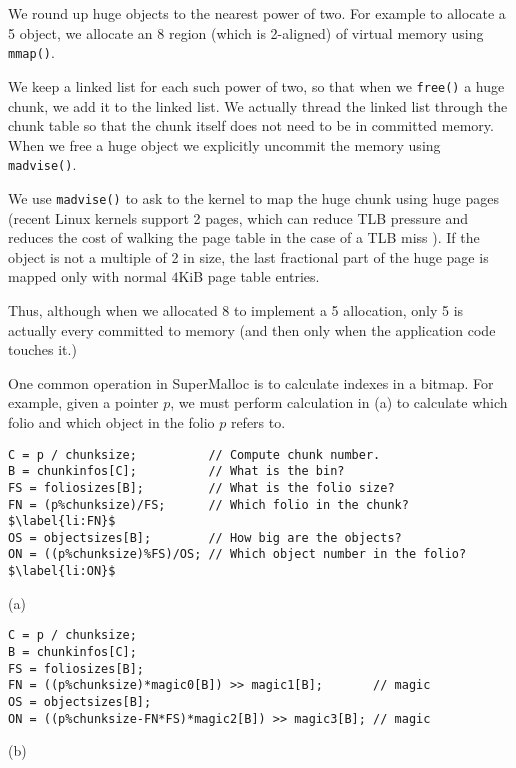 \documentclass[pldi]{sigplanconf-pldi15}
\newcommand{\code}[1]{\texttt{#1}}
\begin{document}
We round up huge objects to the nearest power of two.  For example to
allocate a \unit{5}\mebi\byte{} object, we allocate an
\unit{8}\mebi\byte{} region (which is \unit{2}\mebi\byte{}-aligned) of
virtual memory using \code{mmap()}.

We keep a linked list for each such power of two, so that when we
\code{free()} a huge chunk, we add it to the linked list.  We actually
thread the linked list through the chunk table so that the chunk
itself does not need to be in committed memory.  When we free a huge
object we explicitly uncommit the memory using \code{madvise()}.

We use \code{madvise()} to ask to the kernel to map the huge chunk
using huge pages (recent Linux kernels support \unit{2}\mebi\byte{}
pages, which can reduce TLB pressure and reduces the cost of walking
the page table in the case of a TLB miss \cite{Corbet11}).  If the
object is not a multiple of \unit{2}\mebi\byte{} in size, the last
fractional part of the huge page is mapped only with normal $4$KiB
page table entries.

Thus, although when we allocated \unit{8}\mebi\byte{} to implement a
\unit{5}\mebi\byte{} allocation, only \unit{5}\mebi\byte{} is
actually every committed to memory (and then only when the application
code touches it.)


One common operation in SuperMalloc is to calculate indexes in a
bitmap.  For example, given a pointer $p$, we must perform calculation
in (a) to calculate which folio and which object in
the folio $p$ refers to.

\begin{figure*}
\begin{verbatim}
C = p / chunksize;          // Compute chunk number.
B = chunkinfos[C];          // What is the bin?
FS = foliosizes[B];         // What is the folio size?
FN = (p%chunksize)/FS;      // Which folio in the chunk?$\label{li:FN}$
OS = objectsizes[B];        // How big are the objects?
ON = ((p%chunksize)%FS)/OS; // Which object number in the folio?$\label{li:ON}$
\end{verbatim}
\begin{center}
(a)
\end{center}
\begin{verbatim}
C = p / chunksize;
B = chunkinfos[C];
FS = foliosizes[B];
FN = ((p%chunksize)*magic0[B]) >> magic1[B];       // magic
OS = objectsizes[B];
ON = ((p%chunksize-FN*FS)*magic2[B]) >> magic3[B]; // magic
\end{verbatim}
\begin{center}
(b)
\end{center}
\caption{The calculation to compute the folio number in the chunk,
  \code{FN}, and the object number in the folio \code{ON}, so that the
  bitmap for the free objects in the folio can be updated.  (a) shows
  the code with expensive divisions in .  (b) shows
  the code with the divisions replaced by multiplication and shift.}
\label{fig:bitindex}
\end{figure*}
\end{document}
